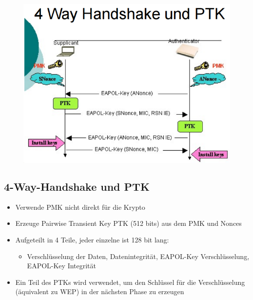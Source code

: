 \documentclass[openany]{book}
\begin{document}
\newpage

\begin{figure}[h!]
    \centering
    \includegraphics[width=\linewidth]{Pics/PTK.PNG}
\end{figure}

\subsection{4-Way-Handshake und PTK}

\begin{itemize}
    \item Verwende PMK nicht direkt für die Krypto
    \item Erzeuge Pairwise Transient Key PTK (512 bits) aus dem PMK und Nonces
    \item Aufgeteilt in 4 Teile, jeder einzelne ist 128 bit lang:
    \begin{itemize}
        \item Verschlüsselung der Daten, Datenintegrität, EAPOL-Key Verschlüsselung, EAPOL-Key Integrität
    \end{itemize}
    \item Ein Teil des PTKs wird verwendet, um den Schlüssel für die Verschlüsselung (äquivalent zu WEP) in der nächsten Phase zu erzeugen
\end{itemize}
\end{document}
